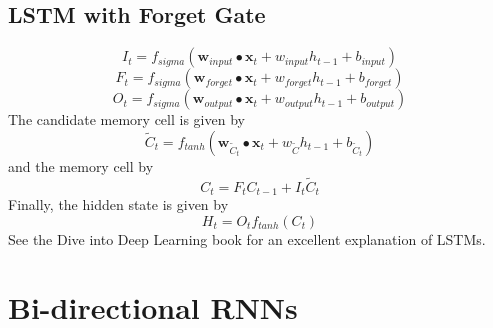 \documentclass[]{article}
\begin{document}
\subsection{LSTM with Forget Gate}
\begin{equation}
I_{t} = f_{sigma}(\textbf{w}_{input} \bullet \textbf{x}_{t} + w_{input} h_{t-1} + b_{input})
\end{equation}
\begin{equation}
F_{t} = f_{sigma}(\textbf{w}_{forget} \bullet \textbf{x}_{t} + w_{forget} h_{t-1} + b_{forget})
\end{equation}
\begin{equation}
O_{t} = f_{sigma}(\textbf{w}_{output} \bullet \textbf{x}_{t} + w_{output} h_{t-1} + b_{output})
\end{equation}
The candidate memory cell is given by
\begin{equation}
\tilde{C}_{t} = f_{tanh}(\textbf{w}_{\tilde{C}_{t}} \bullet \textbf{x}_{t} + w_{\tilde{C}} h_{t-1} + b_{\tilde{C}_{t}})
\end{equation}
and the memory cell by
\begin{equation}
C_{t} = F_{t}  C_{t-1} + I_{t} \tilde{C}_{t}
\end{equation}
Finally, the hidden state is given by
\begin{equation}
H_{t} = O_{t}f_{tanh}(C_{t})
\end{equation}
See the Dive into Deep Learning book for an excellent explanation of LSTMs.

\section{Bi-directional RNNs}




\begin{comment}
\begin{thebibliography}{1}
	
	\bibitem{bullinaria}
	John~A Bullinaria.
	\newblock Recurrent neural networks neural computation : Lecture 12, 2015.
	\newblock Available at https://www.cs.bham.ac.uk/~jxb/INC/l12.pdf.
	
	\bibitem{DBLP:journals/corr/ChoMGBSB14}
	Kyunghyun Cho, Bart van Merrienboer, {\c{C}}aglar G{\"{u}}l{\c{c}}ehre, Fethi
	Bougares, Holger Schwenk, and Yoshua Bengio.
	\newblock Learning phrase representations using {RNN} encoder-decoder for
	statistical machine translation.
	\newblock {\em CoRR}, abs/1406.1078, 2014.
	
	\bibitem{zhang-lipton-li-smola}
	Aston Zhang, Zack~C Lipton, Mu~Li, and Alex~J Smola.
	\newblock 9.1. gated recurrent units (gru).
	\newblock Available at https://d2l.ai/chapter{\_}recurrent-modern/gru.html.
\end{thebibliography}
\end{comment}
\end{document}
